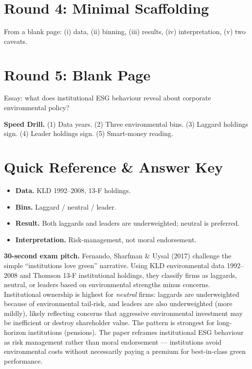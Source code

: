 \documentclass[11pt]{article}
\begin{document}
\section*{Round 4: Minimal Scaffolding}
From a blank page: (i) data, (ii) binning, (iii) results, (iv) interpretation, (v) two caveats.

\section*{Round 5: Blank Page}
Essay: what does institutional ESG behaviour reveal about corporate environmental policy?

\vspace{6pt}
\begin{drillbox}
\textbf{Speed Drill.} (1) Data years. (2) Three environmental bins. (3) Laggard holdings sign. (4) Leader holdings sign. (5) Smart-money reading.
\end{drillbox}

\section*{Quick Reference \& Answer Key}
\begin{answerbox}
\begin{itemize}
\item \textbf{Data.} KLD 1992--2008, 13-F holdings.
\item \textbf{Bins.} Laggard / neutral / leader.
\item \textbf{Result.} Both laggards and leaders are underweighted; neutral is preferred.
\item \textbf{Interpretation.} Risk-management, not moral endorsement.
\end{itemize}
\end{answerbox}

\begin{keybox}
\textbf{30-second exam pitch.} Fernando, Sharfman \& Uysal (2017) challenge the simple ``institutions love green'' narrative. Using KLD environmental data 1992--2008 and Thomson 13-F institutional holdings, they classify firms as laggards, neutral, or leaders based on environmental strengths minus concerns. Institutional ownership is highest for \emph{neutral} firms: laggards are underweighted because of environmental tail-risk, and leaders are also underweighted (more mildly), likely reflecting concerns that aggressive environmental investment may be inefficient or destroy shareholder value. The pattern is strongest for long-horizon institutions (pensions). The paper reframes institutional ESG behaviour as risk management rather than moral endorsement --- institutions avoid environmental costs without necessarily paying a premium for best-in-class green performance.
\end{keybox}
\end{document}
